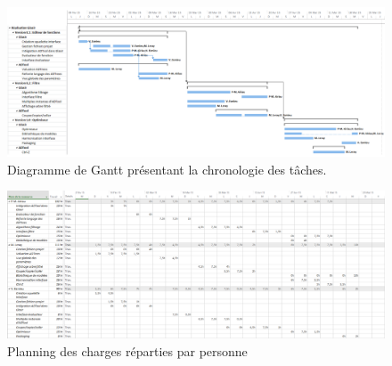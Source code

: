 		\begin{landscape}
		 	\begin{figure}
	            \centering
	            \includegraphics[height=0.70\textwidth]{figure/DiagGantt.png}
	            \caption{Diagramme de Gantt présentant la chronologie des tâches.}
	            \label{fig:gantt}
	        \end{figure}
	    \end{landscape}

		\begin{landscape}
		 	\begin{figure}
	            \centering
	            \includegraphics[height=0.70\textwidth]{figure/RepartitionTaches2.png}
	            \caption{Planning des charges réparties par personne}
	            \label{fig:planning_charge}
	        \end{figure}
	    \end{landscape}


